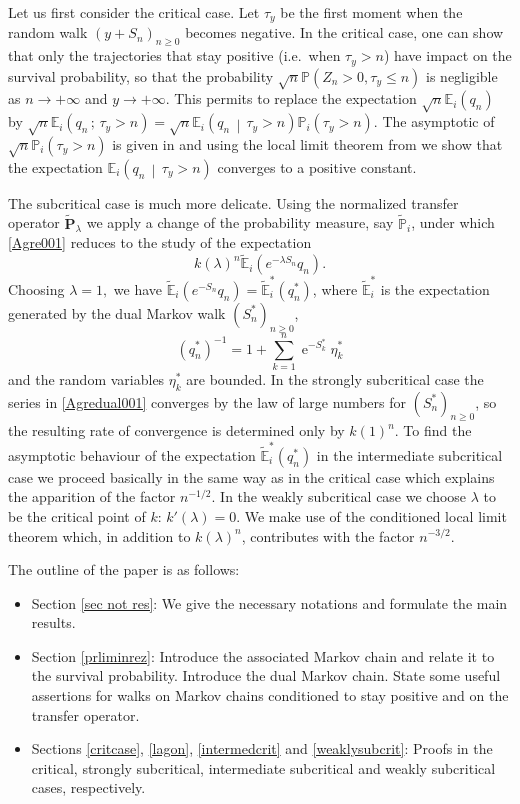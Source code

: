 \documentclass[12pt]{amsart}
\theoremstyle{definition}
\numberwithin{equation}{section}
\newcommand*{\sachant}[2]{\left.#1 \,\middle|\,#2\right.}
\def\bb#1{\mathbb{#1}}
\def\tbf#1{\tilde{\mathbf{#1}}}
\def\tbb#1{\tilde{\mathbb{#1}}}
\def\geq{\geqslant}
\def\leq{\leqslant}
\renewcommand\ll{\lambda}
\DeclareMathOperator{\e}{e}
\begin{document}
Let us first consider the critical case. Let $\tau_y$ be the first moment when the random walk $\left(y+ S_n \right)_{n\geq 0}$ becomes negative.
In the critical case, one can show that only the trajectories that stay positive (i.e.\ when $\tau_y>n$) 
have impact on the survival probability, so that the probability $\sqrt{n}\bb P\left( Z_n>0, \tau_y\leq n \right)$ is negligible as  $n\to+\infty$ and $y\to+\infty$.    
This permits to replace the expectation $\sqrt{n}\mathbb E_i (q_n)$ 
by $\sqrt{n}\bb E_i\left( q_n \,;\, \tau_y > n \right)=\sqrt{n}\bb E_i\left( \sachant{q_n}{\tau_y > n} \right) \bb P_i\left(\tau_y > n \right)$.
The asymptotic of $\sqrt{n}\mathbb P_i\left(\tau_y > n \right)$ is given in \cite{grama_limit_2016-1}
and using the local limit theorem from \cite{GLLP_CLLT_2017}
we show that the expectation $\bb E_i\left( \sachant{q_n}{\tau_y > n} \right)$ converges to a positive constant.

The subcritical case is much more delicate. Using the normalized transfer operator $\tbf P_{\ll}$ we apply a change of the probability measure, say $\tbb P_i$, under which \eqref{Agre001} reduces to the study of the expectation 
\[
k(\ll)^n  \tbb E_i \left( e^{-\ll S_n} q_n \right).
\]
Choosing $\ll=1,$ we have $\tbb E_i \left( e^{- S_n} q_n \right) = \tbb E^*_i \left( q^*_n \right)$,
where 
$\tbb E^*_i$ is the expectation generated by the dual Markov walk  $\left( S^*_n \right)_{n\geq 0}$,
\begin{equation}
\label{Agredual001}
 (q^*_n)^{-1}= 1 + \sum_{k=1}^{n} \e^{-S^*_k} \eta^*_k
\end{equation}
and the random variables $\eta^*_k$ are bounded.
In the strongly subcritical case the series in
\eqref{Agredual001} converges by the law of large numbers for $\left( S^*_n \right)_{n\geq 0}$,
so the resulting rate of convergence is determined only by $k(1)^{n}.$
To find the asymptotic behaviour of the expectation
$\tbb E^*_i \left( q^*_n \right)$
in the intermediate subcritical case we proceed basically in the same way as in the critical case
which explains the apparition of the factor $n^{-1/2}$.
In the weakly subcritical case we choose $\ll$ to be the critical point of $k$: $k'(\ll)=0$. 
We make use of the conditioned local limit theorem which, in addition to $k(\ll)^{n}$, contributes with the factor $n^{-3/2}$.   
 
The outline of the paper is as follows: 
\begin{itemize}
\item Section \ref{sec not res}: We give the necessary notations and formulate the main results.
\item Section \ref{prliminrez}: 
Introduce the associated Markov chain and relate it to the survival probability.
Introduce the dual Markov chain. 
State some useful assertions for walks on Markov chains conditioned to stay positive and on the transfer operator.
\item Sections \ref{critcase}, \ref{lagon}, \ref{intermedcrit} and \ref{weaklysubcrit}: Proofs in the critical, strongly subcritical, intermediate subcritical and weakly subcritical cases, respectively.
\end{itemize}
\end{document}
